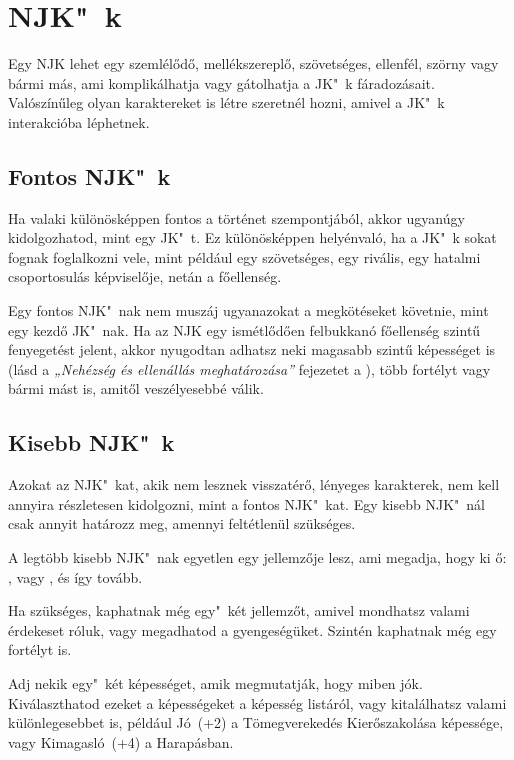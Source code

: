 \section{NJK"~k}

Egy NJK lehet egy szemlélődő, mellékszereplő, szövetséges, ellenfél, szörny vagy bármi más, ami komplikálhatja vagy gátolhatja a JK"~k fáradozásait. Valószínűleg olyan karaktereket is létre szeretnél hozni, amivel a JK"~k interakcióba léphetnek.

\subsection{Fontos NJK"~k}

Ha valaki különösképpen fontos a történet szempontjából, akkor ugyanúgy kidolgozhatod, mint egy JK"~t. Ez különösképpen helyénvaló, ha a JK"~k sokat fognak foglalkozni vele, mint például egy szövetséges, egy rivális, egy hatalmi csoportosulás képviselője, netán a főellenség.

Egy fontos NJK"~nak nem muszáj ugyanazokat a megkötéseket követnie, mint egy kezdő JK"~nak. Ha az NJK egy ismétlődően felbukkanó főellenség szintű fenyegetést jelent, akkor nyugodtan adhatsz neki magasabb szintű képességet is (lásd a \textit{„Nehézség és ellenállás meghatározása”} fejezetet a ), több fortélyt vagy bármi mást is, amitől veszélyesebbé válik.

\subsection{Kisebb NJK"~k}

Azokat az NJK"~kat, akik nem lesznek visszatérő, lényeges karakterek, nem kell annyira részletesen kidolgozni, mint a fontos NJK"~kat. Egy kisebb NJK"~nál csak annyit határozz meg, amennyi feltétlenül szükséges.

A legtöbb kisebb NJK"~nak egyetlen egy jellemzője lesz, ami megadja, hogy ki ő: ,  vagy , és így tovább.

Ha szükséges, kaphatnak még egy"~két jellemzőt, amivel mondhatsz valami érdekeset róluk, vagy megadhatod a gyengeségüket. Szintén kaphatnak még egy fortélyt is.

Adj nekik egy"~két képességet, amik megmutatják, hogy miben jók. Kiválaszthatod ezeket a képességeket a képesség listáról, vagy kitalálhatsz valami különlegesebbet is, például Jó~(+2) a Tömegverekedés Kierőszakolása képessége, vagy Kimagasló~(+4) a Harapásban.


